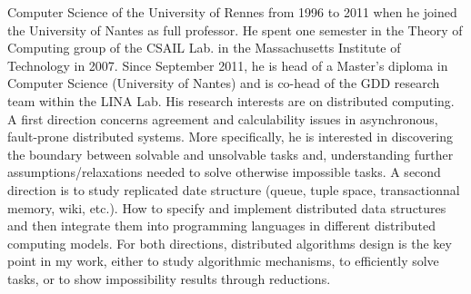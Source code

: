   Computer Science of the University of Rennes from 1996 to 2011 when
  he joined the University of Nantes as full professor. He spent one
  semester in the Theory of Computing group of the CSAIL Lab. in the
  Massachusetts Institute of Technology in 2007. Since September 2011,
  he is head of a Master's diploma in Computer Science (University of
  Nantes) and is co-head of the GDD research team within the LINA Lab.
  His research interests are on distributed computing. A first
  direction concerns agreement and calculability issues in
  asynchronous, fault-prone distributed systems. More specifically, he
  is interested in discovering the boundary between solvable and
  unsolvable tasks and, understanding further assumptions/relaxations
  needed to solve otherwise impossible tasks. A second direction is to
  study replicated date structure (queue, tuple space, transactionnal
  memory, wiki, etc.). How to specify and implement distributed data
  structures and then integrate them into programming languages in
  different distributed computing models. For both directions,
  distributed algorithms design is the key point in my work, either to
  study algorithmic mechanisms, to efficiently solve tasks, or to show
  impossibility results through reductions.

